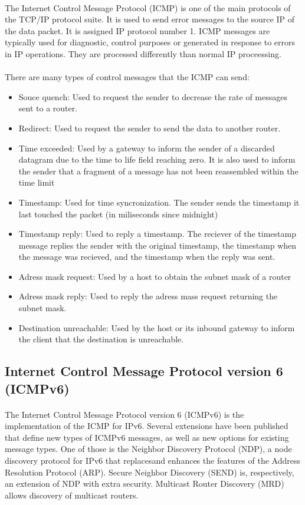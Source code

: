 \documentclass[12pt,a4paper]{report}
\begin{document}
\paragraph{}The Internet Control Message Protocol (ICMP) is one of the main protocols of the TCP/IP protocol suite. It is used to send error messages to the source IP of the data packet. It is assigned IP protocol number 1. ICMP messages are typically used for diagnostic, control purposes or generated in response to errors in IP operations. They are processed differently than normal IP proceessing.
\paragraph{}There are many types of control messages that the ICMP can send:
\begin{itemize}
	\item Souce quench: Used to request the sender to decrease the rate of messages sent to a router.
	\item Redirect: Used to request the sender to send the data to another router.
	\item Time exceeded: Used by a gateway to inform the sender of a discarded datagram due to the time to life field reaching zero. It is also used to inform the sender that a fragment of a message has not been reassembled within the time limit
	\item Timestamp: Used for time syncronization. The sender sends the timestamp it last touched the packet (in miliseconds since midnight)
	\item Timestamp reply: Used to reply a timestamp. The reciever of the timestamp message replies the sender with the original timestamp, the timestamp when the message was recieved, and the timestamp when the reply was sent.
	\item Adress mask request: Used by a host to obtain the subnet mask of a router
	\item Adress mask reply: Used to reply the adress mass request returning the subnet mask.
	\item Destination unreachable: Used by the host or its inbound gateway to inform the client that the destination is unreachable.
\end{itemize}

\subsection{Internet Control Message Protocol version 6 (ICMPv6)}
\paragraph{}The Internet Control Message Protocol version 6 (ICMPv6) is the implementation of the ICMP for IPv6. Several extensions have been published that define new types of ICMPv6 messages, as well as new options for existing message types. One of those is the Neighbor Discovery Protocol (NDP), a node discovery protocol for IPv6 that replacesand enhances the features of the Address Resolution Protocol (ARP). Secure Neighbor Discovery (SEND) is, respectively, an extension of NDP with extra security. Multicast Router Discovery (MRD) allows discovery of multicast routers.
\end{document}
